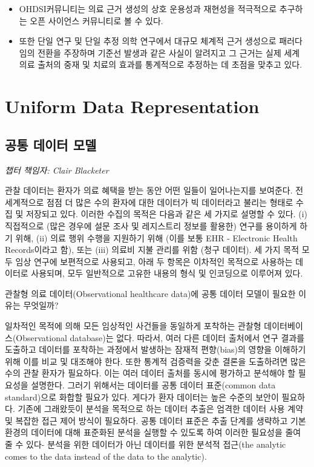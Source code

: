 \documentclass[11pt]{book}
\theoremstyle{definition}
\theoremstyle{definition}
\theoremstyle{definition}
\theoremstyle{remark}
\let\BeginKnitrBlock\begin \let\EndKnitrBlock\end
\begin{document}
\BeginKnitrBlock{rmdsummary}
\begin{itemize}
\item
  OHDSI커뮤니티는 의료 근거 생성의 상호 운용성과 재현성을 적극적으로
  추구하는 오픈 사이언스 커뮤니티로 볼 수 있다.
\item
  또한 단일 연구 및 단일 추정 의학 연구에서 대규모 체계적 근거 생성으로
  패러다임의 전환을 주장하며 기준선 발생과 같은 사실이 알려지고 그
  근거는 실제 세계 의료 출처의 중재 및 치료의 효과를 통계적으로 추정하는
  데 초점을 맞추고 있다.
\end{itemize}
\EndKnitrBlock{rmdsummary}

\part{Uniform Data
Representation}\label{part-uniform-data-representation}

\chapter{공통 데이터 모델}\label{CommonDataModel}

\emph{챕터 책임자: Clair Blacketer}

관찰 데이터는 환자가 의료 혜택을 받는 동안 어떤 일들이 일어나는지를
보여준다. 전 세계적으로 점점 더 많은 수의 환자에 대한 데이터가 빅
데이터라고 불리는 형태로 수집 및 저장되고 있다. 이러한 수집의 목적은
다음과 같은 세 가지로 설명할 수 있다. (i) 직접적으로 (많은 경우에 설문
조사 및 레지스트리 정보를 활용한) 연구를 용이하게 하기 위해, (ii) 의료
행위 수행을 지원하기 위해 (이를 보통 EHR - Electronic Health
Records이라고 함), 또는 (iii) 의료비 지불 관리를 위함 (청구 데이터). 세
가지 목적 모두 임상 연구에 보편적으로 사용되고, 아래 두 항목은 이차적인
목적으로 사용하는 데이터로 사용되며, 모두 일반적으로 고유한 내용의 형식
및 인코딩으로 이루어져 있다. 

관찰형 의료 데이터(Observational healthcare data)에 공통 데이터 모델이
필요한 이유는 무엇일까?

일차적인 목적에 의해 모든 임상적인 사건들을 동일하게 포착하는 관찰형
데이터베이스(Observational database)는 없다. 따라서, 여러 다른 데이터
출처에서 연구 결과를 도출하고 데이터를 포착하는 과정에서 발생하는 잠재적
편향(bias)의 영향을 이해하기 위해 이를 비교 및 대조해야 한다. 또한
통계적 검증력을 갖춘 결론을 도출하려면 많은 수의 관찰 환자가 필요하다.
이는 여러 데이터 출처를 동시에 평가하고 분석해야 할 필요성을 설명한다.
그러기 위해서는 데이터를 공통 데이터 표준(common data standard)으로
화합할 필요가 있다. 게다가 환자 데이터는 높은 수준의 보안이 필요하다.
기존에 그래왔듯이 분석을 목적으로 하는 데이터 추출은 엄격한 데이터 사용
계약 및 복잡한 접근 제어 방식이 필요하다. 공통 데이터 표준은 추출 단계를
생략하고 기본 환경의 데이터에 대해 표준화된 분석을 실행할 수 있도록 하여
이러한 필요성을 줄여 줄 수 있다- 분석을 위한 데이터가 아닌 데이터를 위한
분석적 접근(the analytic comes to the data instead of the data to the
analytic).
\end{document}
